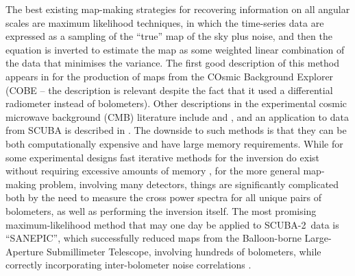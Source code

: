 \documentclass[useAMS,usenatbib,nofootinbib]{mn2e}
\newcommand{\scuba}{SCUBA-2}
\begin{document}
The best existing map-making strategies for recovering information on
all angular scales are maximum likelihood techniques, in which the
time-series data are expressed as a sampling of the ``true'' map of
the sky plus noise, and then the equation is inverted to estimate the
map as some weighted linear combination of the data that minimises the
variance.  The first good description of this method appears in
\citet{janssen1992} for the production of maps from the COsmic
Background Explorer (COBE -- the description is relevant despite the
fact that it used a differential radiometer instead of
bolometers). Other descriptions in the experimental cosmic microwave
background (CMB) literature include \citet{tegmark1997} and
\citet{stompor2002}, and an application to data from SCUBA is
described in \citet{borys2004}.  The downside to such methods is that
they can be both computationally expensive and have large memory
requirements. While for some experimental designs fast iterative
methods for the inversion do exist without requiring excessive amounts
of memory \citep[e.g.,][]{wright1996}, for the more general map-making
problem, involving many detectors, things are significantly
complicated both by the need to measure the cross power spectra for
all unique pairs of bolometers, as well as performing the inversion
itself. The most promising maximum-likelihood method that may one day
be applied to \scuba\ data is ``SANEPIC'', which successfully reduced
maps from the Balloon-borne Large-Aperture Submillimeter Telescope,
involving hundreds of bolometers, while correctly incorporating
inter-bolometer noise correlations \citep[][]{patanchon2008}.
\end{document}
